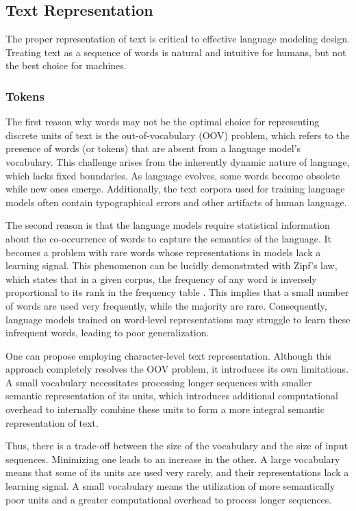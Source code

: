 \subsection{Text Representation}

The proper representation of text is critical to effective language modeling design. Treating text as a sequence of words is natural and intuitive for humans, but not the best choice for machines.

\subsubsection*{Tokens}\label{sec:tokens}

The first reason why words may not be the optimal choice for representing discrete units of text is the out-of-vocabulary (OOV) problem, which refers to the presence of words (or tokens) that are absent from a language model's vocabulary. This challenge arises from the inherently dynamic nature of language, which lacks fixed boundaries. As language evolves, some words become obsolete while new ones emerge. Additionally, the text corpora used for training language models often contain typographical errors and other artifacts of human language.

The second reason is that the language models require statistical information about the co-occurrence of words to capture the semantics of the language. It becomes a problem with rare words whose representations in models lack a learning signal. This phenomenon can be lucidly demonstrated with Zipf's law, which states that in a given corpus, the frequency of any word is inversely proportional to its rank in the frequency table \parencite{estoup1916}. This implies that a small number of words are used very frequently, while the majority are rare. Consequently, language models trained on word-level representations may struggle to learn these infrequent words, leading to poor generalization.

One can propose employing character-level text representation. Although this approach completely resolves the OOV problem, it introduces its own limitations. A small vocabulary necessitates processing longer sequences with smaller semantic representation of its units, which introduces additional computational overhead to internally combine these units to form a more integral semantic representation of text.

Thus, there is a trade-off between the size of the vocabulary and the size of input sequences. Minimizing one leads to an increase in the other. A large vocabulary means that some of its units are used very rarely, and their representations lack a learning signal. A small vocabulary means the utilization of more semantically poor units and a greater computational overhead to process longer sequences.

